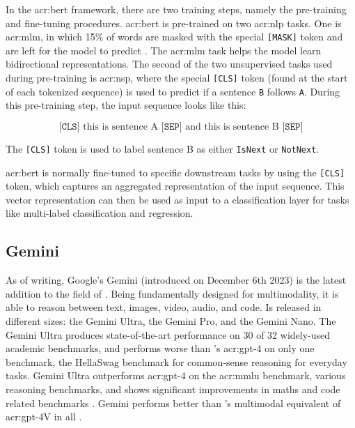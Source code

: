 In the \acrshort{acr:bert} framework, there are two training steps, namely the pre-training and fine-tuning procedures. \acrshort{acr:bert} is pre-trained on two \acrshort{acr:nlp} tasks. One is \gls{acr:mlm}, in which 15\% of words are masked with the special \texttt{[MASK]} token and are left for the model to predict \citep[4]{devlinBERTPretrainingDeep2019}. The \gls{acr:mlm} task helps the model learn bidirectional representations. The second of the two unsupervised tasks used during pre-training is \gls{acr:nsp}, where the special \texttt{[CLS]} token (found at the start of each tokenized sequence) is used to predict if a sentence \texttt{B} follows \texttt{A}. During this pre-training step, the input sequence looks like this:

$$
    \texttt{[CLS]} \text{ this is sentence A } \texttt{[SEP]} \text{ and this is sentence B } \texttt{[SEP]}
$$

The \texttt{[CLS]} token is used to label sentence B as either \texttt{IsNext} or \texttt{NotNext}.

\acrshort{acr:bert} is normally fine-tuned to specific downstream tasks by using the \texttt{[CLS]} token, which captures an aggregated representation of the input sequence. This vector representation can then be used as input to a classification layer for tasks like multi-label classification and regression.

\subsection{Gemini}\label{subsec:gemini}

As of writing, Google's Gemini \citep{geminiteamGeminiFamilyHighly2023} (introduced on December 6th 2023) is the latest addition to the field of . Being fundamentally designed for multimodality, it is able to reason between text, images, video, audio, and code. Is released in different sizes: the Gemini Ultra, the Gemini Pro, and the Gemini Nano. The Gemini Ultra produces state-of-the-art performance on 30 of 32 widely-used academic benchmarks, and performs worse than \citeauthor{openaiGPT4TechnicalReport2023}'s \acrshort{acr:gpt}-4 on only one benchmark, the HellaSwag benchmark for common-sense reasoning for everyday tasks. Gemini Ultra outperforms \acrshort{acr:gpt}-4 on the \acrshort{acr:mmlu} benchmark, various reasoning benchmarks, and shows significant improvements in maths and code related benchmarks  \citep[7]{geminiteamGeminiFamilyHighly2023}. Gemini performs better than \citeauthor{openaiGPT4TechnicalReport2023}'s multimodal equivalent of \acrshort{acr:gpt}-4V in all  \citep[12]{geminiteamGeminiFamilyHighly2023}.

